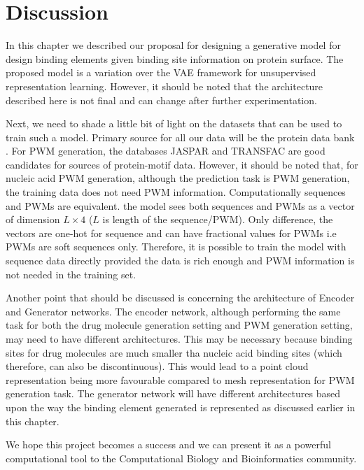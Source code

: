 \section{Discussion}
In this chapter we described our proposal for designing a generative model for design binding
elements given binding site information on protein surface. The proposed model is a variation over the VAE
framework \citep{Kingma2014} for unsupervised representation learning. However, it should be noted
that the architecture described here is not final and can change after further experimentation.

Next, we need to shade a little bit of light on the datasets that can be used to train such a model.
Primary source for all our data will be the protein data bank \citep{berman2000protein}. For PWM
generation, the databases JASPAR \citep{fornes2020jaspar} and TRANSFAC \citep{wingender2008transfac}
are good candidates for sources of protein-motif data. However, it should
be noted that, for nucleic acid PWM generation, although the prediction task is PWM generation, the
training data does not need PWM information. Computationally sequences and PWMs are equivalent. the model
sees both sequences and PWMs as a vector of dimension $L \times 4$ ($L$ is length of the
sequence/PWM). Only difference, the vectors are one-hot for sequence and can have fractional values
for PWMs i.e PWMs are soft sequences only. Therefore, it is possible to train the model with
sequence data directly provided the data is rich enough and PWM information is not needed in the
training set. 

Another point that should be discussed is concerning the architecture of Encoder and Generator
networks. The encoder network, although performing the same task for both the drug molecule
generation setting and PWM generation setting, may need to have different architectures. This may be necessary because binding sites for drug molecules are much smaller tha
nucleic acid binding sites (which therefore, can also be discontinuous). This would lead to a point
cloud representation being more favourable compared to mesh representation for PWM generation task.
The generator network will have different architectures based upon the way the binding element
generated is represented as discussed earlier in this chapter.

We hope this project becomes a success and we can present it as a powerful computational tool to the
Computational Biology and Bioinformatics community.
